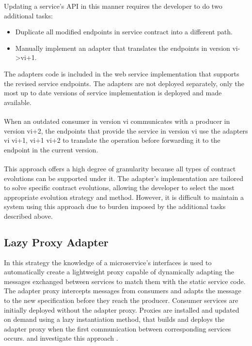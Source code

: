 Updating a service's API in this manner requires the developer to do two additional tasks:
\begin{itemize}
    \item Duplicate all modified endpoints in service contract into a different path.
    \item Manually implement an adapter that translates the endpoints in version vi->vi+1.
\end{itemize}
The adapters code is included in the web service implementation that supports the revised service endpoints.
The adapters are not deployed separately, only the most up to date versions of service implementation is deployed and made available.

\paragraph{}

When an outdated consumer in version vi communicates with a producer in version vi+2, the endpoints that provide the service
in version vi use the adapters vi \textrightarrow vi+1, vi+1 \textrightarrow vi+2 to translate the operation before forwarding it to the endpoint in the current version.

\paragraph{}

This approach offers a high degree of granularity because all types of contract evolutions can be supported under it.
The adapter's implementation are tailored to solve specific contract evolutions, allowing the developer to select the most appropriate evolution strategy and method.
However, it is difficult to maintain a system using this approach due to burden imposed by the additional tasks described above.

\subsection{Lazy Proxy Adapter} %
\label{sec:proxy_adapter}

In this strategy the knowledge of a microservice’s
interfaces is used to automatically create a lightweight proxy capable of dynamically adapting the messages exchanged between services to match them with the static service code.
The adapter proxy intercepts messages from consumers and adapts the message to the new specification before they reach the producer.
Consumer services are initially deployed without the adapter proxy.
Proxies are installed and updated on demand using a lazy instantiation method, that builds and deploys the adapter proxy when the first communication between corresponding services occurs.
\citeauthor{seco2020robust} and \citeauthor{santosregent} investigate this approach \cite{seco2020robust, santosregent}.

